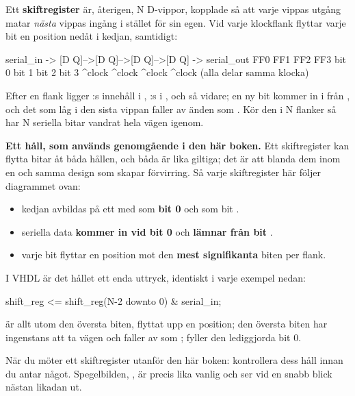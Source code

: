 Ett \textbf{skiftregister} är, återigen, N D-vippor, kopplade så att varje vippas utgång matar
\emph{nästa} vippas ingång i stället för sin egen. Vid varje klockflank flyttar varje bit en
position nedåt i kedjan, samtidigt:

\begin{textdrawing}
serial_in -> [D Q]-->[D Q]-->[D Q]-->[D Q] -> serial_out
              FF0     FF1     FF2     FF3
             bit 0   bit 1   bit 2   bit 3
              ^clock  ^clock  ^clock  ^clock   (alla delar samma klocka)
\end{textdrawing}

Efter en flank ligger :s innehåll i , :s i , och så vidare;
en ny bit kommer in i  från , och det som låg i den sista vippan faller av
änden som . Kör den i N flanker så har N seriella bitar vandrat hela vägen igenom.

\textbf{Ett håll, som används genomgående i den här boken.} Ett skiftregister kan flytta bitar åt
båda hållen, och båda är lika giltiga; det är att blanda dem inom en och samma design som skapar
förvirring. Så varje skiftregister här följer diagrammet ovan:
\begin{itemize}
  \item kedjan avbildas på ett  med  som \textbf{bit 0} och
     som bit .
  \item seriella data \textbf{kommer in vid bit 0} och \textbf{lämnar från bit }.
  \item varje bit flyttar en position mot den \textbf{mest signifikanta} biten per flank.
\end{itemize}

I VHDL är det hållet ett enda uttryck, identiskt i varje exempel nedan:

\begin{vhdlcode}
shift_reg <= shift_reg(N-2 downto 0) & serial_in;
\end{vhdlcode}

 är allt utom den översta biten, flyttat upp en position; den översta
biten har ingenstans att ta vägen och faller av som ;  fyller den
lediggjorda bit 0.

När du möter ett skiftregister utanför den här boken: kontrollera dess håll innan du antar något.
Spegelbilden, , är precis lika vanlig och ser vid en
snabb blick nästan likadan ut.

